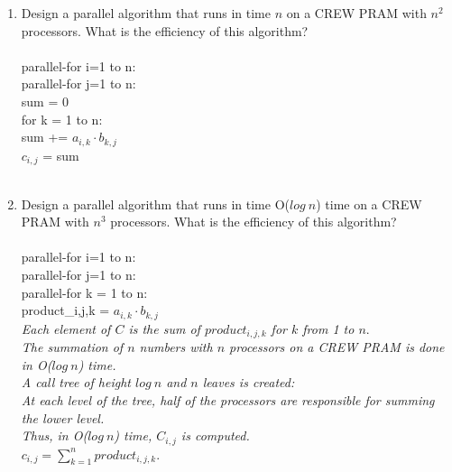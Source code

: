 \documentclass[10pt]{article}
\newcommand{\tab}{\hspace*{2em}}
\newcommand{\tabb}{\hspace*{4em}}
\newcommand{\tabbb}{\hspace*{6em}}
\begin{document}
\begin{enumerate}
\item Design a parallel algorithm that runs in time $n$ on a CREW PRAM with $n^2$
processors. What is the efficiency of this algorithm?\\
\\
parallel-for i=1 to n:\\
\tab parallel-for j=1 to n:\\
\tabb sum = 0\\
\tabb for k = 1 to n:\\
\tabbb sum += $a_{i,k} \cdot b_{k,j}$\\
\tabb $c_{i,j}$ = sum\\
\\

\item Design a parallel algorithm that runs in time O($log~n$) time on a CREW PRAM with $n^3$
processors. What is the efficiency of this algorithm?\\
\\
parallel-for i=1 to n:\\
\tab parallel-for j=1 to n:\\
\tabb parallel-for k = 1 to n:\\
\tabbb product_{i,j,k} = $a_{i,k} \cdot b_{k,j}$\\
\tabb \emph{Each element of $C$ is the sum of $product_{i,j,k}$ for $k$ from 1 to $n$}.\\
\tabb \emph{The summation of $n$ numbers with $n$ processors on a CREW PRAM is done in O($log~n$) time.}\\
\tabb \emph{A call tree of height $log~n$ and $n$ leaves is created:}\\
\tabb \emph{At each level of the tree, half of the processors are responsible for summing the lower level.}\\
\tabb \emph{Thus, in O($log~n$) time, $C_{i,j}$ is computed.}\\
\tabb $c_{i,j} = \sum_{k=1}^{n}product_{i,j,k}$.\\
\\


\end{enumerate}
\end{document}
